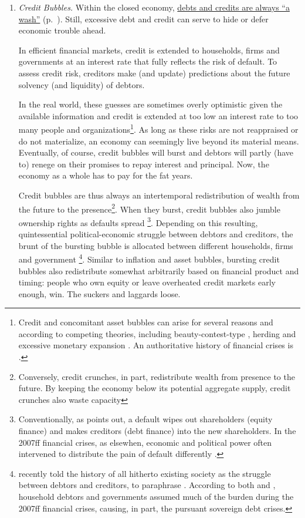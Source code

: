 \begin{enumerate}
	\item {} \label{it:creditbubbles} \emph{Credit Bubbles.} Within the closed economy, \hyperref[it:creditsdebitswash]{debts and credits are always ``a wash''} (p.~\pageref{it:creditsdebitswash}). Still, excessive debt and credit can serve to hide or defer economic trouble ahead. 

	In efficient financial markets, credit is extended to households, firms and governments at an interest rate that fully reflects the risk of default. To assess credit risk, creditors make (and update) predictions about the future solvency (and liquidity) of debtors. 

	In the real world, these guesses are sometimes overly optimistic given the available information and credit is extended at too low an interest rate to too many people and organizations\footnote{
		Credit and concomitant asset bubbles can arise for several reasons and according to competing theories, including beauty-contest-type \citep{Keynes1936}, herding \citep{Banerjee-1992-aa} and excessive monetary expansion \citep{Stiglitz2010}. An authoritative history of financial crises is \cite{KindlebergerAliber-2005-aa}.}. 
	As long as these risks are not reappraised or do not materialize, an economy can seemingly live beyond its material means. Eventually, of course, credit bubbles will burst and debtors will partly (have to) renege on their promises to repay interest and principal. Now, the economy as a whole has to pay for the fat years.

	Credit bubbles are thus always an intertemporal redistribution of wealth from the future to the presence\footnote{
		Conversely, credit crunches, in part, redistribute wealth from presence to the future. By keeping the economy below its potential aggregate supply, credit crunches also waste capacity}. 
	When they burst, credit bubbles also jumble ownership rights as defaults spread \citep{Stiglitz2010}\footnote{
		Conventionally, as \citeauthor{Stiglitz2010} points out, a default wipes out shareholders (equity finance) and makes creditors (debt finance) into the new shareholders. In the 2007ff financial crises, as elsewhen, economic and political power often intervened to distribute the pain of default differently \citep{Stiglitz2010}.}. 
	Depending on this resulting, quintessential political-economic struggle between debtors and creditors, the brunt of the bursting bubble is allocated between different households, firms and government \citep{Coggan2011}\footnote{
		\citealt{Coggan2011} recently told the history of all hitherto existing society as the struggle between debtors and creditors, to paraphrase \cite{MarxEngels-1848-aa}. According to both \citeauthor{Coggan2011} and \cite{Stiglitz2010}, household debtors and governments assumed much of the burden during the 2007ff financial crises, causing, in part, the pursuant sovereign debt crises.}. 
	Similar to inflation and asset bubbles, bursting credit bubbles also redistribute somewhat arbitrarily based on financial product and timing: people who own equity or leave overheated credit markets early enough, win. The suckers and laggards loose.


\end{enumerate}
